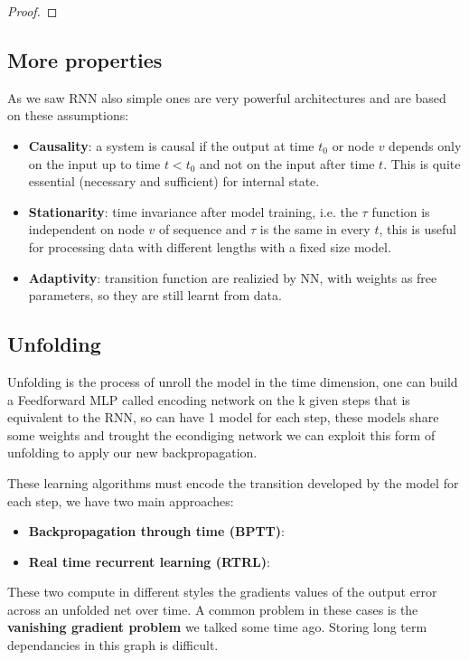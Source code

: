 \documentclass[12pt]{book}
\begin{document}
\begin{proof}

\end{proof}

\subsection{More properties}
As we saw RNN also simple ones are very powerful architectures and are based on these assumptions: \newline
\begin{itemize}
	\item \textbf{Causality}: a system is causal if the output at time $t_0$ or node $v$ depends only on the input up to time $t < t_0$ and not on the input after time $t$. This is quite essential (necessary and sufficient) for internal state.
	\item \textbf{Stationarity}: time invariance after model training, i.e. the $\tau$ function is independent on node $v$ of sequence and $\tau$ is the same in every $t$, this is useful for processing data with different lengths with a fixed size model.
	\item \textbf{Adaptivity}: transition function are realizied by NN, with weights as free parameters, so they are still learnt from data.
\end{itemize}

\subsection{Unfolding}
Unfolding is the process of unroll the model in the time dimension, one can build a Feedforward MLP called encoding network on the k given steps that is equivalent to the RNN, so can have 1 model for each step, these models share some weights and trought the econdiging network we can exploit this form of unfolding to apply our new backpropagation.

These learning algorithms must encode the transition developed by the model for each step, we have two main approaches: 
\begin{itemize}
	\item \textbf{Backpropagation through time (BPTT)}:
	\item \textbf{Real time recurrent learning (RTRL)}: 
\end{itemize}
These two compute in different styles the gradients values of the output error across an unfolded net over time. A common problem in these cases is the \textbf{vanishing gradient problem} we talked some time ago. Storing long term dependancies in this graph is difficult.
\end{document}
